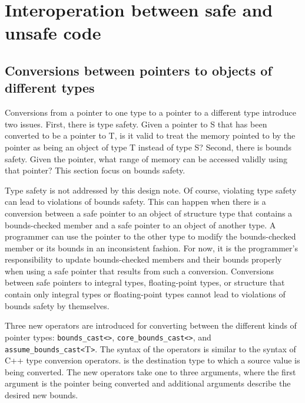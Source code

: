 
\chapter{Interoperation between safe and unsafe code}
\label{interoperation-between-safe-and-unsafe-code}

\section{Conversions between pointers to objects of different types}
\label{conversions-between-pointers-to-objects-of-different-types}

Conversions from a pointer to one type to a pointer to a different type
introduce two issues. First, there is type safety. Given a pointer to S
that has been converted to be a pointer to T, is it valid to treat the
memory pointed to by the pointer as being an object of type T instead of
type S? Second, there is bounds safety. Given the pointer, what range of
memory can be accessed validly using that pointer? This section focus on
bounds safety.

Type safety is not addressed by this design note. Of course, violating
type safety can lead to violations of bounds safety. This can happen
when there is a conversion between a safe pointer to an object of
structure type that contains a bounds-checked member and a safe pointer
to an object of another type. A programmer can use the pointer to the
other type to modify the bounds-checked member or its bounds in an
inconsistent fashion. For now, it is the programmer's responsibility to
update bounds-checked members and their bounds properly when using a
safe pointer that results from such a conversion. Conversions between
safe pointers to integral types, floating-point types, or structure that
contain only integral types or floating-point types cannot lead to
violations of bounds safety by themselves.

Three new operators are introduced for converting between the different
kinds of pointer types:
\texttt{bounds\_cast\textless{}}\texttt{\textgreater{}},
\texttt{core\_bounds\_cast\textless{}}\texttt{\textgreater{}},
and \texttt{assume\_bounds\_cast\textless{}}T\texttt{\textgreater{}}.
The syntax of the operators is similar to the syntax of C++ type
conversion operators.  is the destination type to which a source
value is being converted. The new operators take one to three arguments,
where the first argument is the pointer being converted and additional
arguments describe the desired new bounds.


